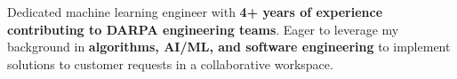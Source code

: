

\begin{cvparagraph}

Dedicated machine learning engineer with \textbf{4+ years of experience contributing to DARPA engineering teams}. Eager to leverage my background in \textbf{algorithms, AI/ML, and software engineering} to implement solutions to customer requests in a collaborative workspace.
\end{cvparagraph}
